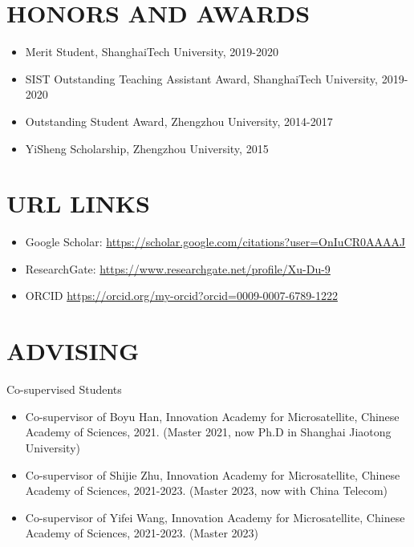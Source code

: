 \documentclass[paper=a4,fontsize=11pt]{scrartcl} %
\newcommand{\sepspace}{\vspace*{1em}}		%
\newcommand{\NewPart}[1]{\section*{\uppercase{#1}}}
\newcommand{\EducationEntry}[4]{
	\noindent \textbf{#1} \hfill      %
	\colorbox{White}{%
		\parbox{5cm}{%
			\hfill\color{Black}#2}} \par  %
	\noindent \textit{#3} \par        %
	\noindent\hangindent=2em\hangafter=0 \small #4 %
	\normalsize \par}
\begin{document}
			
			\NewPart{HONORS AND AWARDS}
			\begin{itemize}
				\item Merit Student, ShanghaiTech University, 2019-2020
				
				\item SIST Outstanding Teaching Assistant Award, ShanghaiTech University, 2019-2020
				
				
				\item Outstanding Student Award, Zhengzhou University, 2014-2017
				
				\item YiSheng Scholarship, Zhengzhou University, 2015
				
				
			\end{itemize}
			\NewPart{URL Links}
			\begin{itemize}
				\item Google Scholar: \url{https://scholar.google.com/citations?user=OnIuCR0AAAAJ}
				\item ResearchGate: \url{https://www.researchgate.net/profile/Xu-Du-9}
				\item ORCID \url{https://orcid.org/my-orcid?orcid=0009-0007-6789-1222}
			\end{itemize}
			\NewPart{Advising}{Co-supervised Students}
			\begin{itemize}
				\item Co-supervisor of Boyu Han, Innovation Academy for Microsatellite, Chinese Academy of Sciences, 2021.
				(Master 2021, now Ph.D in Shanghai Jiaotong University)
				\item Co-supervisor of Shijie Zhu, Innovation Academy for Microsatellite, Chinese Academy of Sciences, 2021-2023.
				(Master 2023, now with China Telecom)
				\item Co-supervisor of Yifei Wang, Innovation Academy for Microsatellite, Chinese Academy of Sciences, 2021-2023.
				(Master 2023)
			\end{itemize}
			
\end{document}
